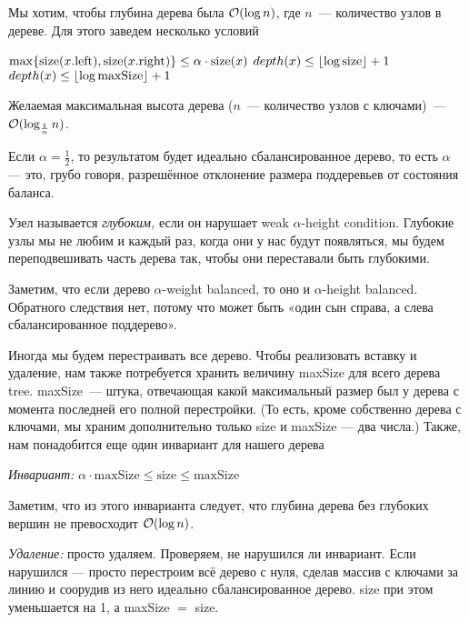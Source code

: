 Мы хотим, чтобы глубина дерева была $\BigO(\log n)$, где $n$~--- количество узлов в дереве. Для этого заведем несколько условий

\begin{algorithmic}[0]
	\algrenewcommand{}
		\State $\max \set*{\size (x.\text{left}), \size (x.\text{right})} \leq \alpha \cdot \size (x)$
	\EndProcedure
		\State $depth(x) \leq \floor*{\log \text{size}} + 1$
	\EndProcedure
		\State $depth(x) \leq \floor*{\log \text{maxSize}} + 1$ 
	\EndProcedure
\end{algorithmic}

Желаемая максимальная высота дерева ($n$~— количество узлов с ключами)~— $\BigO(\log_{\frac{1}{\alpha}} n)$.

Если $\alpha = \frac{1}{2}$, то результатом будет идеально сбалансированное дерево, то есть $\alpha$ — это, грубо говоря, разрешённое отклонение размера поддеревьев от состояния баланса.

Узел называется {\it глубоким,} если он нарушает weak $\alpha$-height condition. Глубокие узлы мы не любим и каждый раз, когда они у нас будут появляться, мы будем переподвешивать часть дерева так, чтобы они переставали быть глубокими.

Заметим, что если дерево $\alpha$-weight balanced, то оно и $\alpha$-height balanced. Обратного следствия нет, потому что может быть «один сын справа, а слева сбалансированное поддерево».

Иногда мы будем перестраивать все дерево. Чтобы реализовать вставку и удаление, нам также потребуется хранить величину maxSize для всего дерева tree. maxSize~— штука, отвечающая какой максимальный размер был у дерева с момента последней его полной перестройки. (То есть, кроме собственно дерева с ключами, мы храним дополнительно только size и maxSize — два числа.) Также, нам понадобится еще один инвариант для нашего дерева

{\it Инвариант:} $\alpha \cdot \text{maxSize} \leq \text{size} \leq \text{maxSize}$

Заметим, что из этого инварианта следует, что глубина дерева без глубоких вершин не превосходит $\BigO(\log n)$.

{\it Удаление:} просто удаляем. Проверяем, не нарушился ли инвариант. Если нарушился — просто перестроим всё дерево с нуля, сделав массив с ключами за линию и соорудив из него идеально сбалансированное дерево. size при этом уменьшается на 1, а maxSize $=$ size.

